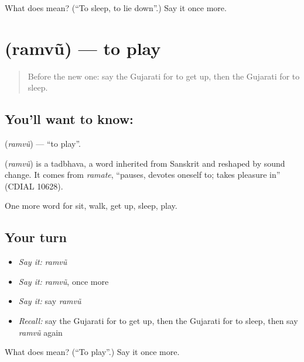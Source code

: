 \begin{tcolorbox}[breakable,colback=teal!4,colframe=teal!35!black,title={Before you move on}]
What does  mean? (\textquotedblleft{}To sleep, to lie down\textquotedblright{}.) Say it once more.
\end{tcolorbox}
\section[\texorpdfstring{\gu{રમવું} (ramvũ)}{રમવું (ramvũ)}]{ (ramvũ) — to play}

\label{lesson:GU-C54-ramvu}



\begin{quote}
Before the new one: say the Gujarati for to get up, then the Gujarati for to sleep.
\end{quote}

\subsection*{You'll want to know: }
\textbf{} (\emph{ramvũ}) — \textquotedblleft{}to play\textquotedblright{}.

\begin{cousinweb}
\textbf{} (\emph{ramvũ}) is a tadbhava, a word inherited from Sanskrit and reshaped by sound change. It comes from \emph{ramate}, \textquotedblleft{}pauses, devotes oneself to; takes pleasure in\textquotedblright{} (CDIAL 10628).
\end{cousinweb}

\begin{grammarlens}[title={What you've built}]
One more word for sit, walk, get up, sleep, play.
\end{grammarlens}

\subsection*{Your turn}
\begin{itemize}
\raggedright
  \item \emph{Say it:} \emph{ramvũ}
  \item \emph{Say it:} \emph{ramvũ}, once more
  \item \emph{Say it:} say \emph{ramvũ}
  \item \emph{Recall:} say the Gujarati for to get up, then the Gujarati for to sleep, then say \emph{ramvũ} again
\end{itemize}

\begin{tcolorbox}[breakable,colback=teal!4,colframe=teal!35!black,title={Before you move on}]
What does  mean? (\textquotedblleft{}To play\textquotedblright{}.) Say it once more.
\end{tcolorbox}
